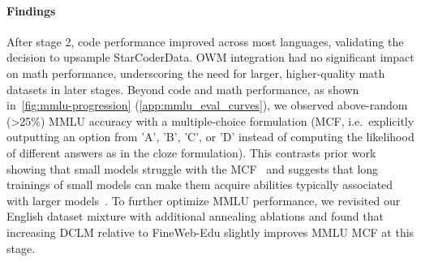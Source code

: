 \documentclass{article}
\theoremstyle{plain}
\theoremstyle{definition}
\theoremstyle{remark}
\begin{document}
\vspace{-0.25cm} 
\paragraph{Findings} After stage 2, code performance improved across most languages, validating the decision to upsample StarCoderData. OWM integration had no significant impact on math performance, underscoring the need for larger, higher-quality math datasets in later stages.
Beyond code and math performance, as shown in~\cref{fig:mmlu-progression} (\cref{app:mmlu_eval_curves}), we observed above-random  (>25\%) MMLU accuracy with a multiple-choice formulation (MCF, i.e.\ explicitly outputting an option from 'A', 'B', 'C', or 'D' instead of computing the likelihood of different answers as in the cloze formulation).
This contrasts prior work showing that small models struggle with the MCF~\cite{gu2024olmes,du2024understanding} and suggests that long trainings of small models can make them acquire abilities typically associated with larger models~\cite{blakeney2024does,gu2024olmes,du2024understanding}.
To further optimize MMLU performance, we revisited our English dataset mixture with additional annealing ablations and found that increasing DCLM relative to FineWeb-Edu slightly improves MMLU MCF at this stage.

\begin{table}[t]
\caption{Average model performance on different benchmark categories \textbf{after each training stage}. Stages 1-3 are during stable phase (no decay). Full per-benchmark results in \cref{app:evals_stages_full}.}
\label{tab:training_stages_evals_short}
\vspace{0.5em}
\vspace{-0.35cm} 

\end{table}
\end{document}
